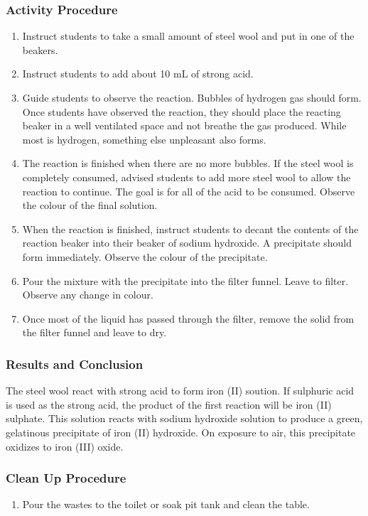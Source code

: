 \subsubsection*{Activity Procedure}
\begin{enumerate}
\item{Instruct students to take a small amount of steel wool and put in one of the beakers.}
\item{Instruct students to add about 10 mL of strong acid.}
\item{Guide students to observe the reaction. Bubbles of hydrogen gas should form. Once students have observed the reaction, they should place the reacting beaker in a well ventilated space and not breathe the gas produced. While most is hydrogen, something else unpleasant also forms.}
\item{The reaction is finished when there are no more bubbles. If the steel wool is completely consumed, advised students to add more steel wool to allow the reaction to continue. The goal is for all of the acid to be consumed. Observe the colour of the final solution.}
\item{When the reaction is finished, instruct students to decant the contents of the reaction beaker into their beaker of sodium hydroxide. A precipitate should form immediately. Observe the colour of the precipitate.}
\item{Pour the mixture with the precipitate into the filter funnel. Leave to filter. Observe any change in colour.}
\item{Once most of the liquid has passed through the filter, remove the solid from the filter funnel and leave to dry.}
\end{enumerate}

\subsubsection*{Results and Conclusion}
The steel wool react with strong acid to form iron (II) soution. If sulphuric acid is used as the strong acid, the product of the first reaction will be iron (II) sulphate. This solution reacts with sodium hydroxide solution to produce a green, gelatinous precipitate of iron (II) hydroxide. On exposure to air, this precipitate oxidizes to iron (III) oxide.

\subsubsection*{Clean Up Procedure}
\begin{enumerate}
\item{Pour the wastes to the toilet or soak pit tank and clean the table.}
\end{enumerate}

